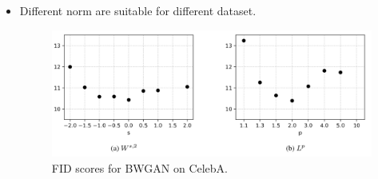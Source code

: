 \documentclass[landscape,headrule,footrule]{foils}
\begin{document}

\begin{frame}
\begin{flushleft}
\begin{itemize}
\item Different norm are suitable for different dataset. \\
\begin{figure}
\center
\includegraphics[scale=0.8]{figure/fig6.png}
\caption{FID scores for BWGAN on CelebA.}
\end{figure}

\end{itemize}
\end{flushleft}
\end{frame}

\end{document}
